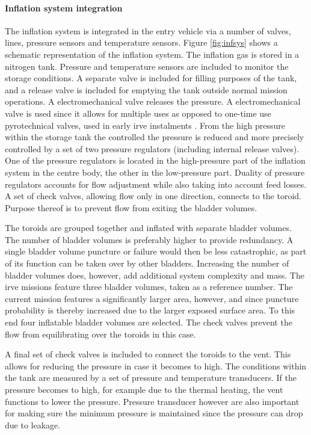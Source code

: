 \paragraph{Inflation system integration}
The inflation system is integrated in the entry vehicle via a number of valves, lines, pressure sensors and temperature sensors. Figure \ref{fig:infsys} shows a schematic representation of the inflation system. The inflation gas is stored in a nitrogen tank. Pressure and temperature sensors are included to monitor the storage conditions. A separate valve is included for filling purposes of the tank, and a release valve is included for emptying the tank outside normal mission operations. A electromechanical valve releases the pressure. A electromechanical valve is used since it allows for multiple uses as opposed to one-time use pyrotechnical valves, used in early \gls{irve} instalments \cite{Hughes2005}. From the high pressure within the storage tank the controlled the pressure is reduced and more precisely controlled by a set of two pressure regulators (including internal release valves). One of the pressure regulators is located in the high-pressure part of the inflation system in the centre body, the other in the low-pressure part. Duality of pressure regulators accounts for flow adjustment while also taking into account feed losses. A set of check valves, allowing flow only in one direction, connects to the toroid. Purpose thereof is to prevent flow from exiting the bladder volumes. 

The toroids are grouped together and inflated with separate bladder volumes.  The number of bladder volumes is preferably higher to provide redundancy. A single bladder volume puncture or failure would then be less catastrophic, as part of its function can be taken over by other bladders. Increasing the number of bladder volumes does, however, add additional system complexity and mass. The \gls{irve} missions feature three bladder volumes, taken as a reference number. The current mission features a significantly larger area, however, and since puncture probability is thereby increased due to the larger exposed surface area. To this end four inflatable bladder volumes are selected. The check valves prevent the flow from equilibrating over the toroids in this case.

A final set of check valves is included to connect the toroids to the vent. This allows for reducing the pressure in case it becomes to high. The conditions within the tank are measured by a set of pressure and temperature transducers. If the pressure becomes to high, for example due to the thermal heating, the vent functions to lower the pressure. Pressure transducer however are also important for making sure the minimum pressure is maintained since the pressure can drop due to leakage. 

